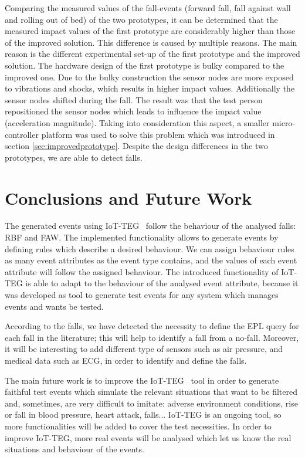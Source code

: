 \documentclass[review]{elsarticle}
\begin{document}
Comparing the measured values of the fall-events (forward fall, fall against wall and rolling out of bed) of the two 
prototypes, it can be determined that the measured impact values of the first prototype are considerably higher than 
those of the improved solution. This difference is caused by multiple reasons. The main reason is the different 
experimental set-up of the first prototype and the improved solution. The hardware design of the first prototype is 
bulky compared to the improved one. Due to the bulky construction the sensor nodes are more exposed to vibrations and 
shocks, which results in higher impact values. Additionally the sensor nodes shifted during the fall. The result was 
that the test person repositioned the sensor nodes which leads to influence the impact value (acceleration magnitude). 
Taking into consideration this aspect, a smaller micro-controller platform was used to solve this problem which was introduced in  section \ref{sec:improvedprototype}. Despite the design differences in the two prototypes, 
we are able to detect falls.

\section{Conclusions and Future Work}
\label{sec:conclusions}

The generated events using IoT-TEG~\cite{TesisGutierrez2017,Gutierrez2017} follow the behaviour of the analysed falls: 
RBF and FAW. The implemented functionality 
allows to generate events by defining rules which describe a desired behaviour. We can assign behaviour rules as many 
event attributes as the event type contains, and the values of each event attribute will follow the assigned behaviour.
The introduced functionality of IoT-TEG is able to adapt to the behaviour of the analysed event attribute, because
it was developed as tool to generate test events for any system which manages events and wants be tested.

According to the falls, we have detected the necessity to define the EPL query for each fall in the literature; this will
help to identify a fall from a no-fall. Moreover, it will be interesting to add different type of sensors such as air
pressure, and medical data such as ECG, in order to identify and define the falls.

The main future work is to improve the IoT-TEG~\cite{TesisGutierrez2017,Gutierrez2017} tool in order to generate faithful 
test events which simulate the 
relevant situations that want to be filtered and, sometimes, are very difficult to imitate: adverse environment conditions, 
rise or fall in blood pressure, heart attack, falls... IoT-TEG is an ongoing tool, so more functionalities will be added
to cover the test necessities. In order to improve IoT-TEG, more real events will be analysed which let us know 
the real situations and behaviour of the events.
\end{document}

